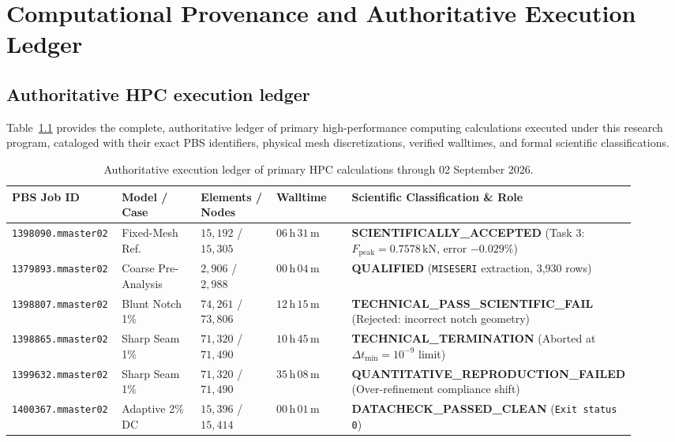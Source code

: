 \appendix
\chapter{Computational Provenance and Authoritative Execution Ledger}
\label{app:repro}

\section{Authoritative HPC execution ledger}
Table~\ref{tab:app_job_ledger} provides the complete, authoritative ledger of primary high-performance computing calculations executed under this research program, cataloged with their exact PBS identifiers, physical mesh discretizations, verified walltimes, and formal scientific classifications.

\begin{table}[htbp]
\centering
\caption{Authoritative execution ledger of primary HPC calculations through 02 September 2026.}
\label{tab:app_job_ledger}
\footnotesize
\begin{tabularx}{\linewidth}{p{0.18\linewidth}p{0.16\linewidth}p{0.14\linewidth}p{0.14\linewidth}p{0.30\linewidth}}
\toprule
\textbf{PBS Job ID} & \textbf{Model / Case} & \textbf{Elements / Nodes} & \textbf{Walltime} & \textbf{Scientific Classification \& Role} \\
\midrule
\texttt{1398090.mmaster02} & Fixed-Mesh Ref. & $15{,}192$ / $15{,}305$ & $06\,\mathrm{h}\,31\,\mathrm{m}$ & \textbf{SCIENTIFICALLY\_ACCEPTED} (Task 3: $F_{\text{peak}} = 0.7578\,\mathrm{kN}$, error $-0.029\%$) \\
\texttt{1379893.mmaster02} & Coarse Pre-Analysis & $2{,}906$ / $2{,}988$ & $00\,\mathrm{h}\,04\,\mathrm{m}$ & \textbf{QUALIFIED} (\texttt{MISESERI} extraction, 3,930 rows) \\
\texttt{1398807.mmaster02} & Blunt Notch 1\% & $74{,}261$ / $73{,}806$ & $12\,\mathrm{h}\,15\,\mathrm{m}$ & \textbf{TECHNICAL\_PASS\_SCIENTIFIC\_FAIL} (Rejected: incorrect notch geometry) \\
\texttt{1398865.mmaster02} & Sharp Seam 1\% & $71{,}320$ / $71{,}490$ & $10\,\mathrm{h}\,45\,\mathrm{m}$ & \textbf{TECHNICAL\_TERMINATION} (Aborted at $\Delta t_{\min} = 10^{-9}$ limit) \\
\texttt{1399632.mmaster02} & Sharp Seam 1\% & $71{,}320$ / $71{,}490$ & $35\,\mathrm{h}\,08\,\mathrm{m}$ & \textbf{QUANTITATIVE\_REPRODUCTION\_FAILED} (Over-refinement compliance shift) \\
\texttt{1400367.mmaster02} & Adaptive 2\% DC & $15{,}396$ / $15{,}414$ & $00\,\mathrm{h}\,01\,\mathrm{m}$ & \textbf{DATACHECK\_PASSED\_CLEAN} (\texttt{Exit status 0}) \\

\end{tabularx}
\end{table}
